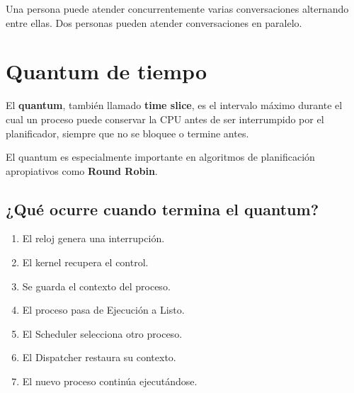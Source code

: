 \documentclass[
  spanish,
  letterpaper,
]{scrbook}
\providecommand{\tightlist}{%
  \setlength{\itemsep}{0pt}\setlength{\parskip}{0pt}}
\begin{document}
\begin{tcolorbox}[enhanced jigsaw, arc=.35mm, bottomrule=.15mm, bottomtitle=1mm, breakable, colback=white, colbacktitle=quarto-callout-note-color!10!white, colframe=quarto-callout-note-color-frame, coltitle=black, left=2mm, leftrule=.75mm, opacityback=0, opacitybacktitle=0.6, rightrule=.15mm, title=\textcolor{quarto-callout-note-color}{\faInfo}\hspace{0.5em}{Ejemplo}, titlerule=0mm, toprule=.15mm, toptitle=1mm]

Una persona puede atender concurrentemente varias conversaciones
alternando entre ellas. Dos personas pueden atender conversaciones en
paralelo.

\end{tcolorbox}


\chapter{Quantum de tiempo}\label{quantum-de-tiempo}

El \textbf{quantum}, también llamado \textbf{time slice}, es el
intervalo máximo durante el cual un proceso puede conservar la CPU antes
de ser interrumpido por el planificador, siempre que no se bloquee o
termine antes.

El quantum es especialmente importante en algoritmos de planificación
apropiativos como \textbf{Round Robin}.

\section{¿Qué ocurre cuando termina el
quantum?}\label{quuxe9-ocurre-cuando-termina-el-quantum}

\begin{enumerate}
\def\labelenumi{\arabic{enumi}.}
\tightlist
\item
  El reloj genera una interrupción.
\item
  El kernel recupera el control.
\item
  Se guarda el contexto del proceso.
\item
  El proceso pasa de Ejecución a Listo.
\item
  El Scheduler selecciona otro proceso.
\item
  El Dispatcher restaura su contexto.
\item
  El nuevo proceso continúa ejecutándose.
\end{enumerate}
\end{document}
